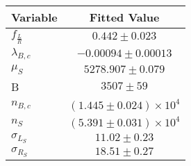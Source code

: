 \begin{tabular}[t]{lc}
\hline
Variable &Fitted Value\\
\hline\hline
$f_{\frac{L}{R}}$&$0.442\pm0.023$\\
\hline
$\lambda_{B,c}$&$-0.00094\pm0.00013$\\
\hline
$\mu_S$&$5278.907\pm0.079$\\
\hline
B&$3507\pm59$\\
\hline
$n_{B,c}$&$(1.445\pm0.024)\times 10^4$\\
\hline
$n_S$&$(5.391\pm0.031)\times 10^4$\\
\hline
$\sigma_{L_S}$&$11.02\pm0.23$\\
\hline
$\sigma_{R_S}$&$18.51\pm0.27$\\
\hline
\end{tabular}